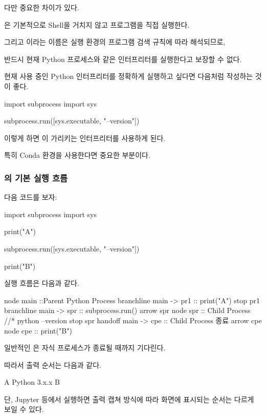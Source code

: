 다만 중요한 차이가 있다.

은 기본적으로 Shell을 거치지 않고 프로그램을 직접 실행한다.

그리고 이라는 이름은 실행 환경의 프로그램 검색 규칙에 따라 해석되므로,

반드시 현재 Python 프로세스와 같은 인터프리터를 실행한다고 보장할 수 없다.

현재 사용 중인 Python 인터프리터를 정확하게 실행하고 싶다면 다음처럼 작성하는 것이 좋다.

\begin{dhkcode}
import subprocess
import sys

subprocess.run([sys.executable, "--version"])
\end{dhkcode}

이렇게 하면 이 가리키는 인터프리터를 사용하게 된다.

특히 Conda 환경을 사용한다면 중요한 부분이다.

\subsubsection{의 기본 실행 흐름}

다음 코드를 보자:

\begin{dhkcode}
import subprocess
import sys

print("A")

subprocess.run([sys.executable, "--version"])

print("B")
\end{dhkcode}

실행 흐름은 다음과 같다.

\begin{dhkbranch}[in=8]
node main ::Parent Python Process
branchline main -> pr1 :: print("A")
stop pr1
branchline main -> spr :: subprocess.run()
arrow spr
node spr :: Child Process //* python --version
stop spr
handoff main -> cpe :: Child Process 종료
arrow cpe
node cpe :: print("B")
\end{dhkbranch}

일반적인 은 자식 프로세스가 종료될 때까지 기다린다.

따라서 출력 순서는 다음과 같다.

\begin{dhkzsh}
A
Python 3.x.x
B
\end{dhkzsh}

단, Jupyter 등에서 실행하면 출력 캡쳐 방식에 따라 화면에 표시되는 순서는 다르게 보일 수 있다.

